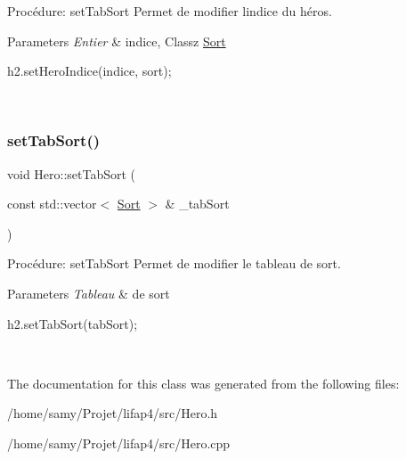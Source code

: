 Procédure\+: set\+Tab\+Sort Permet de modifier l\textquotesingle{}indice du héros. 


\begin{DoxyParams}{Parameters}
{\em Entier} & indice, Classz \hyperlink{classSort}{Sort} 
\begin{DoxyCode}
h2.setHeroIndice(indice, sort);
\end{DoxyCode}
 \\
\hline
\end{DoxyParams}
\mbox{\label{classHero_ae7c967e805c745f63534fa342b395954}} 
\subsubsection{\texorpdfstring{set\+Tab\+Sort()}{setTabSort()}}
{\footnotesize\ttfamily void Hero\+::set\+Tab\+Sort (\begin{DoxyParamCaption}\item[{const std\+::vector$<$ \hyperlink{classSort}{Sort} $>$ \&}]{\+\_\+tab\+Sort }\end{DoxyParamCaption})}



Procédure\+: set\+Tab\+Sort Permet de modifier le tableau de sort. 


\begin{DoxyParams}{Parameters}
{\em Tableau} & de sort 
\begin{DoxyCode}
h2.setTabSort(tabSort);
\end{DoxyCode}
 \\
\hline
\end{DoxyParams}


The documentation for this class was generated from the following files\+:\begin{DoxyCompactItemize}
\item 
/home/samy/\+Projet/lifap4/src/Hero.\+h\item 
/home/samy/\+Projet/lifap4/src/Hero.\+cpp\end{DoxyCompactItemize}
